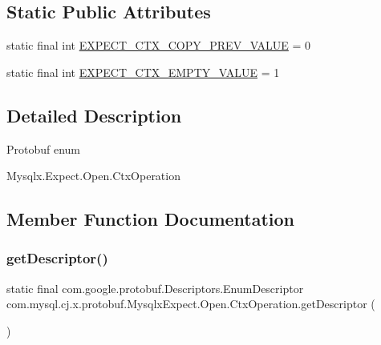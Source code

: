 \subsection*{Static Public Attributes}
\begin{DoxyCompactItemize}
\item 
static final int \mbox{\hyperlink{enumcom_1_1mysql_1_1cj_1_1x_1_1protobuf_1_1_mysqlx_expect_1_1_open_1_1_ctx_operation_aa7cf9cbb9f88e4aabf9f898ceb715b90}{E\+X\+P\+E\+C\+T\+\_\+\+C\+T\+X\+\_\+\+C\+O\+P\+Y\+\_\+\+P\+R\+E\+V\+\_\+\+V\+A\+L\+UE}} = 0
\item 
static final int \mbox{\hyperlink{enumcom_1_1mysql_1_1cj_1_1x_1_1protobuf_1_1_mysqlx_expect_1_1_open_1_1_ctx_operation_a336d6c61b13fcb430b9af0ce586aa6d1}{E\+X\+P\+E\+C\+T\+\_\+\+C\+T\+X\+\_\+\+E\+M\+P\+T\+Y\+\_\+\+V\+A\+L\+UE}} = 1
\end{DoxyCompactItemize}


\subsection{Detailed Description}
Protobuf enum
\begin{DoxyCode}
Mysqlx.Expect.Open.CtxOperation 
\end{DoxyCode}
 

\subsection{Member Function Documentation}
\mbox{\label{enumcom_1_1mysql_1_1cj_1_1x_1_1protobuf_1_1_mysqlx_expect_1_1_open_1_1_ctx_operation_a59f8f5e8a2f3c5fe5b6ca5ca43e5faf7}} 
\subsubsection{\texorpdfstring{get\+Descriptor()}{getDescriptor()}}
{\footnotesize\ttfamily static final com.\+google.\+protobuf.\+Descriptors.\+Enum\+Descriptor com.\+mysql.\+cj.\+x.\+protobuf.\+Mysqlx\+Expect.\+Open.\+Ctx\+Operation.\+get\+Descriptor (\begin{DoxyParamCaption}{ }\end{DoxyParamCaption})\hspace{0.3cm}{\ttfamily [static]}}


